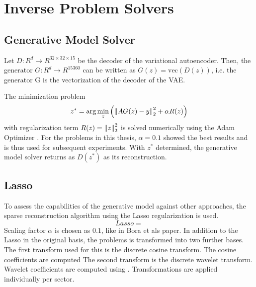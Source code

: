 \section{Inverse Problem Solvers}

\subsection{Generative Model Solver}
Let $D: R^d \rightarrow R^{32 \times 32 \times 15}$ be the decoder of the variational autoencoder.
Then, the generator $G: R^d \rightarrow R^{15360}$ can be written as $G(z) = \text{vec}(D(z))$, i.e. the generator G is the vectorization of the decoder of the VAE.

The minimization problem
\begin{equation}
    z^* = \arg\min_{z}{\left( \left\lVert A G(z) - y\right\rVert_2^2 + \alpha R(z) \right)}
\end{equation}
with regularization term $R(z) = \left\lVert z\right\rVert_2^2$ is solved numerically using the Adam Optimizer \parencite{Adam}.
For the problems in this thesis, $\alpha = 0.1$ showed the best results and is thus used for subsequent experiments.
With $z^*$ determined, the generative model solver returns as $D(z^*)$ as its reconstruction.

\subsection{Lasso}
To assess the capabilities of the generative model against other approaches, the sparse reconstruction algorithm using the Lasso regularization \parencite{Lasso} is used.
\begin{equation}
    Lasso = 
\end{equation}
Scaling factor $\alpha$ is chosen as $0.1$, like in Bora et als paper.
In addition to the Lasso in the original basis, the problems is transformed into two further bases.
The first transform used for this is the discrete cosine transform.
The cosine coefficients are computed
The second transform is the discrete wavelet transform.
Wavelet coefficients are computed using \parencite{PyWavelets}.
Transformations are applied individually per sector.
